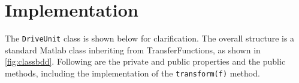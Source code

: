 \section{Implementation}
The \texttt{DriveUnit} class is shown below for clarification. The overall structure is a standard Matlab class inheriting from TransferFunctions, as shown in \cref{fig:classbdd}. Following are the private and public properties and the public methods, including the implementation of the \texttt{transform(f)} method.

\inputminted[linenos, breaklines, bgcolor=lightgray]{matlab}{../Matlab/DriveUnit.m}